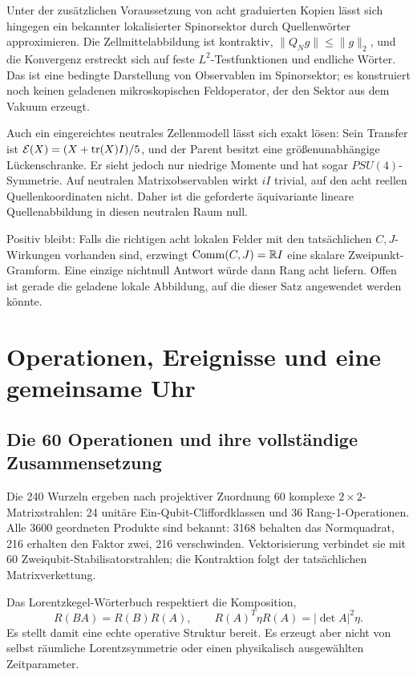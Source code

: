Unter der zusätzlichen Voraussetzung von acht graduierten Kopien lässt sich hingegen ein bekannter lokalisierter Spinorsektor durch Quellenwörter approximieren. Die Zellmittelabbildung ist kontraktiv, $\|Q_Ng\|\le\|g\|_2$, und die Konvergenz erstreckt sich auf feste $L^2$-Testfunktionen und endliche Wörter. Das ist eine bedingte Darstellung von Observablen im Spinorsektor; es konstruiert noch keinen geladenen mikroskopischen Feldoperator, der den Sektor aus dem Vakuum erzeugt. 

Auch ein eingereichtes neutrales Zellenmodell lässt sich exakt lösen: Sein Transfer ist $\mathcal E(X)=(X+\operatorname{tr}(X)I)/5$, und der Parent besitzt eine größenunabhängige Lückenschranke. Er sieht jedoch nur niedrige Momente und hat sogar $PSU(4)$-Symmetrie. Auf neutralen Matrixobservablen wirkt $iI$ trivial, auf den acht reellen Quellenkoordinaten nicht. Daher ist die geforderte äquivariante lineare Quellenabbildung in diesen neutralen Raum null. 

Positiv bleibt: Falls die richtigen acht lokalen Felder mit den tatsächlichen $C,J$-Wirkungen vorhanden sind, erzwingt $\operatorname{Comm}(C,J)=\mathbb R I$ eine skalare Zweipunkt-Gramform. Eine einzige nichtnull Antwort würde dann Rang acht liefern. Offen ist gerade die geladene lokale Abbildung, auf die dieser Satz angewendet werden könnte.

\chapter{Operationen, Ereignisse und eine gemeinsame Uhr}
\section{Die 60 Operationen und ihre vollständige Zusammensetzung}
Die 240 Wurzeln ergeben nach projektiver Zuordnung 60 komplexe $2\times2$-Matrixstrahlen: 24 unitäre Ein-Qubit-Cliffordklassen und 36 Rang-1-Operationen. Alle 3600 geordneten Produkte sind bekannt: 3168 behalten das Normquadrat, 216 erhalten den Faktor zwei, 216 verschwinden. Vektorisierung verbindet sie mit 60 Zweiqubit-Stabilisatorstrahlen; die Kontraktion folgt der tatsächlichen Matrixverkettung. 

Das Lorentzkegel-Wörterbuch respektiert die Komposition,
\[
 R(BA)=R(B)R(A),\qquad
 R(A)^T\eta R(A)=|\det A|^2\eta.
\]
Es stellt damit eine echte operative Struktur bereit. Es erzeugt aber nicht von selbst räumliche Lorentzsymmetrie oder einen physikalisch ausgewählten Zeitparameter.

